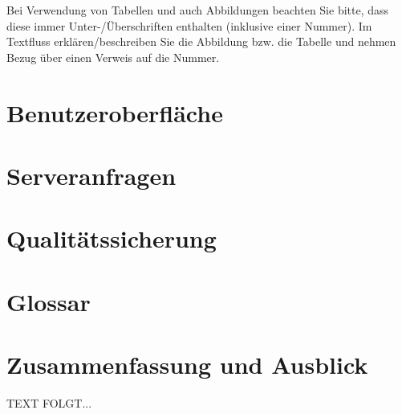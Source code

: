 \documentclass[a4paper,12pt,oneside]{article}
\begin{document}
    \vspace{1cm}
 \begin{tcolorbox}[title={Abbildungen, Tabellen \& Co.}]
Bei Verwendung von Tabellen und auch Abbildungen beachten Sie bitte, dass diese immer Unter-/Überschriften enthalten (inklusive einer Nummer). Im Textfluss erklären/beschreiben Sie die Abbildung bzw. die Tabelle und nehmen Bezug über einen Verweis auf die Nummer.
  \end{tcolorbox}
  
  \newpage  
  \section{Benutzeroberfläche}\label{kap_benutzeroberflaeche}
  
  
  \newpage  
  \section{Serveranfragen}\label{kap_serveranfragen }
  
 
  \newpage  
  \section{Qualitätssicherung }\label{kap_QS}
  

   \newpage  
   \section{Glossar}\label{kap_glossar}
   
   
  \newpage 
  \section{Zusammenfassung und Ausblick}\label{kap_zusammfAusbl}  
   TEXT FOLGT...
   
\end{document}
